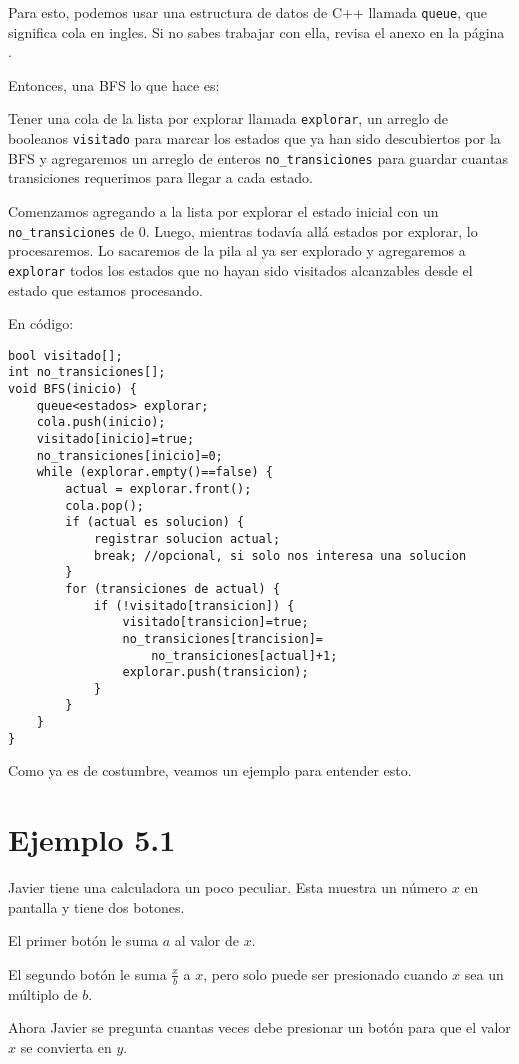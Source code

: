 Para esto, podemos usar una estructura de datos de C++ llamada \verb|queue|, que significa cola en ingles. Si no sabes trabajar con ella, revisa el anexo en la página \pageref{queue}.

Entonces, una BFS lo que hace es:

Tener una cola de la lista por explorar llamada \verb|explorar|, un arreglo de booleanos \verb|visitado| para marcar los estados que ya han sido descubiertos por la BFS y agregaremos un arreglo de enteros \verb|no_transiciones| para guardar cuantas transiciones requerimos para llegar a cada estado.

Comenzamos agregando a la lista por explorar el estado inicial con un \verb|no_transiciones| de \(0\). Luego, mientras todavía allá estados por explorar, lo procesaremos. Lo sacaremos de la pila al ya ser explorado y agregaremos a \verb|explorar| todos los estados que no hayan sido visitados alcanzables desde el estado que estamos procesando.

En código:
\pagebreak
\begin{lstlisting}
bool visitado[];
int no_transiciones[];
void BFS(inicio) {
	queue<estados> explorar;
	cola.push(inicio);
	visitado[inicio]=true;
	no_transiciones[inicio]=0;
	while (explorar.empty()==false) {
		actual = explorar.front();
		cola.pop();
		if (actual es solucion) {
			registrar solucion actual;
			break; //opcional, si solo nos interesa una solucion
		}
		for (transiciones de actual) {
			if (!visitado[transicion]) {
				visitado[transicion]=true;
				no_transiciones[trancision]=
					no_transiciones[actual]+1;
				explorar.push(transicion);
			}
		}
	}
}
\end{lstlisting}
Como ya es de costumbre, veamos un ejemplo para entender esto.
\section*{Ejemplo 5.1}
Javier tiene una calculadora un poco peculiar. Esta muestra un número \(x\) en pantalla y tiene dos botones.

\begin{plimits}
	\item El primer botón le suma \(a\) al valor de \(x\).
	\item El segundo botón le  suma \(\frac{x}{b}\) a \(x\), pero solo puede ser presionado cuando \(x\) sea un múltiplo de \(b\).
\end{plimits}

Ahora Javier se pregunta cuantas veces debe presionar un botón para que el valor \(x\) se convierta en \(y\).

